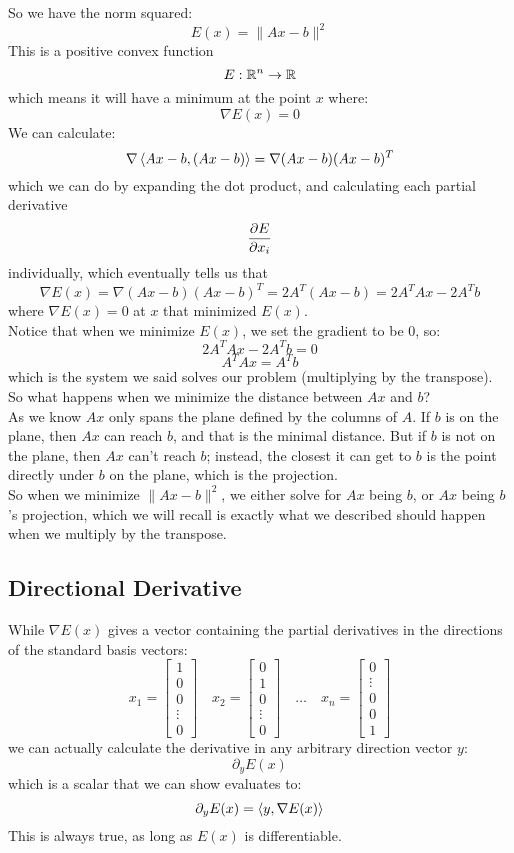 \documentclass[12pt]{article}
\begin{document}
So we have the norm squared:
\[ E(x) = \|Ax - b\|^2 \]
This is a positive convex function
\[ E : \mathbb{R}^n \to \mathbb{R} \]
which means it will have a minimum
at the point $x$ where:
\[ \nabla E(x) = 0 \]
We can calculate:
\[ \nabla \left\langle Ax - b, (Ax - b) \right\rangle 
= \nabla (Ax - b)(Ax - b)^T\]
which we can do by expanding the dot product,
and calculating each partial derivative
\[ \dfrac{\partial E}{\partial x_i} \]
individually,
which eventually tells us that
\[ \nabla E(x) = 
\nabla (Ax - b)(Ax - b)^T
= 2A^T(Ax - b)
= 2A^TAx - 2A^Tb \]
where $\nabla E(x) = 0$
at $x$ that minimized $E(x)$. \\

Notice that when we minimize $E(x)$,
we set the gradient to be $0$, so:
\[ 2A^TAx - 2A^Tb = 0 \]
\[ A^TAx = A^Tb \]
which is the system we said
solves our problem (multiplying by the
transpose). \\

So what happens when we minimize the distance
between $Ax$ and $b$? \\
As we know $Ax$ only spans the plane
defined by the columns of $A$.
If $b$ is on the plane, then $Ax$ can reach $b$,
and that is the minimal distance.
But if $b$ is not on the plane,
then $Ax$ can't reach $b$;
instead, the closest it can get to $b$
is the point directly under $b$
on the plane, which is the projection. \\
So when we minimize $\|Ax - b\|^2$,
we either solve for $Ax$ being $b$,
or $Ax$ being $b$'s projection,
which we will recall is exactly what
we described should happen
when we multiply by the transpose. \\

\newpage

\subsection*{Directional Derivative}

While $\nabla E(x)$ gives 
a vector containing the partial derivatives
in the directions of the standard basis vectors:
\[ x_1 = 
\begin{bmatrix}1 \\ 0 \\ 0 \\ \vdots \\  0\end{bmatrix}
\quad x_2 = 
\begin{bmatrix}0 \\ 1 \\ 0 \\ \vdots \\ 0\end{bmatrix}
\quad \dots \quad x_n = 
\begin{bmatrix}0 \\ \vdots \\ 0 \\ 0 \\ 1\end{bmatrix}\] 
we can actually calculate the derivative in
any arbitrary direction vector $y$:
\[ \partial_yE(x) \]
which is a scalar that we can show evaluates to:
\[ \partial_yE(x) = \left\langle y, \nabla E(x) \right\rangle \]
This is always true,
as long as $E(x)$ is differentiable. \\
\end{document}
